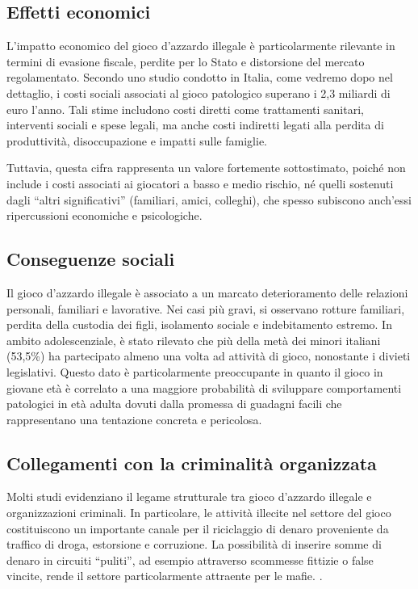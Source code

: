 \documentclass[a4paper,12pt]{article}
\begin{document}
\subsection{Effetti economici}

L’impatto economico del gioco d’azzardo illegale è particolarmente rilevante in termini di evasione fiscale, perdite per lo Stato e distorsione del mercato regolamentato. Secondo uno studio condotto in Italia, come vedremo dopo nel dettaglio, i costi sociali associati al gioco patologico superano i 2,3 miliardi di euro l’anno. Tali stime includono costi diretti come trattamenti sanitari, interventi sociali e spese legali, ma anche costi indiretti legati alla perdita di produttività, disoccupazione e impatti sulle famiglie.
\cite{lucchini2022socialcosts}

Tuttavia, questa cifra rappresenta un valore fortemente sottostimato, poiché non include i costi associati ai giocatori a basso e medio rischio, né quelli sostenuti dagli “altri significativi” (familiari, amici, colleghi), che spesso subiscono anch’essi ripercussioni economiche e psicologiche.

\subsection{Conseguenze sociali}

Il gioco d’azzardo illegale è associato a un marcato deterioramento delle relazioni personali, familiari e lavorative. Nei casi più gravi, si osservano rotture familiari, perdita della custodia dei figli, isolamento sociale e indebitamento estremo. In ambito adolescenziale, è stato rilevato che più della metà dei minori italiani (53,5\%) ha partecipato almeno una volta ad attività di gioco, nonostante i divieti legislativi. Questo dato è particolarmente preoccupante in quanto il gioco in giovane età è correlato a una maggiore probabilità di sviluppare comportamenti patologici in età adulta dovuti dalla promessa di guadagni facili che rappresentano una tentazione concreta e pericolosa.
\cite{gori2014adolescentgambling}

\subsection{Collegamenti con la criminalità organizzata}

Molti studi evidenziano il legame strutturale tra gioco d’azzardo illegale e organizzazioni criminali. In particolare, le attività illecite nel settore del gioco costituiscono un importante canale per il riciclaggio di denaro proveniente da traffico di droga, estorsione e corruzione. La possibilità di inserire somme di denaro in circuiti “puliti”, ad esempio attraverso scommesse fittizie o false vincite, rende il settore particolarmente attraente per le mafie.
\cite{banks2018taxonomy}\cite{tarina2019moneylaundering}.
\end{document}
